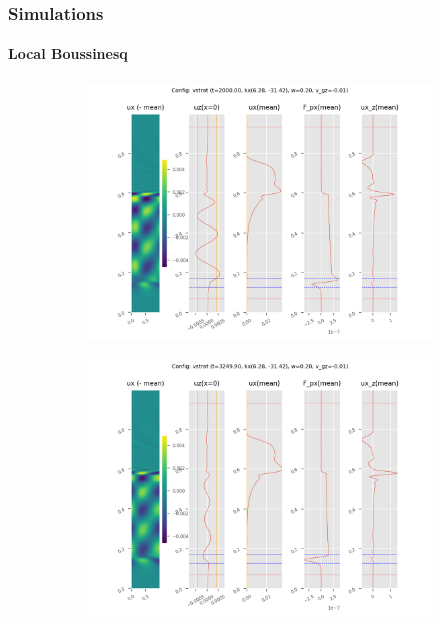 \documentclass[dvipsnames, 10pt]{beamer}
\begin{document}
\begin{frame}
    \frametitle{Simulations}
    \framesubtitle{Local Boussinesq}

    \begin{figure}[t]
        \centering
        \hspace*{-19mm}%
        \begin{subfigure}{0.55\textwidth}
            \centering
            \includegraphics[width=\textwidth]{vstrat_2.png}
        \end{subfigure}
        \begin{subfigure}{0.55\textwidth}
            \centering
            \includegraphics[width=\textwidth]{vstrat_3.png}
        \end{subfigure}
        \hspace*{-19mm}%
    \end{figure}
\end{frame}
\end{document}
